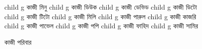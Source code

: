 \documentclass{article}
\begin{document}
\begin{figure}
{\begin{genealogypicture}
{{{{{              }
              child{    g{ কাজী মিনু  } 
              child{    g{ কাজী ডিউক }   }
              child{    g{ কাজী ডেভিড }   }
              child{    g{ কাজী ডিটো }   }
              child{    g{ কাজী টিটো }   }
              }
              child{    g{ কাজী মিলি }   }
              child{    g{ কাজী পারুল }
                  child{    g{ কাজী কাজরি }   }
                  child{    g{ কাজী পাভেল }   }
              }
              child{    g{ কাজী পপি }
                  child{    g{ কাজী ফাহিদ }   }
                  child{    g{ কাজী সামির }   }
              }

          }

      }
    }
    }
    \end{genealogypicture}
    }
    \begin{comment}
      child{
        g{ কাজী }

      }
      \end{comment}
    \caption{কাজী পরিবার}
    \end{figure}
    
\end{document}

